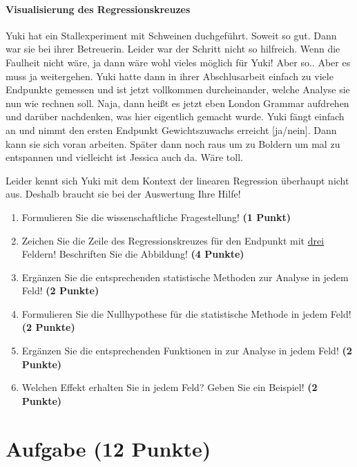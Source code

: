 \documentclass[a4paper, 9pt]{scrartcl}\usepackage[]{graphicx}\usepackage[]{xcolor}
\begin{document}
\ifcollection
\paragraph{Visualisierung des Regressionskreuzes}
\fi

Yuki hat ein Stallexperiment mit Schweinen duchgeführt. Soweit so gut. Dann war sie bei ihrer Betreuerin. Leider war der Schritt nicht so hilfreich.  Wenn die Faulheit nicht wäre, ja dann wäre wohl vieles möglich für Yuki! Aber so.. Aber es muss ja weitergehen. Yuki hatte dann in ihrer Abschlusarbeit einfach zu viele Endpunkte gemessen und ist jetzt vollkommen durcheinander, welche Analyse sie nun wie rechnen soll. Naja, dann heißt es jetzt eben London Grammar aufdrehen und darüber nachdenken, was hier eigentlich gemacht wurde. Yuki fängt einfach an und nimmt den ersten Endpunkt Gewichtszuwachs erreicht [ja/nein]. Dann kann sie sich voran arbeiten. Später dann noch raus um zu Boldern um mal zu entspannen und vielleicht ist Jessica auch da. Wäre toll.

\vspace{1Ex}

Leider kennt sich Yuki mit dem Kontext der linearen Regression überhaupt nicht aus. Deshalb braucht sie bei der Auswertung Ihre Hilfe!

\begin{enumerate}
  \item Formulieren Sie die wissenschaftliche Fragestellung! \textbf{(1 Punkt)}
\item Zeichen Sie die Zeile des Regressionskreuzes für den Endpunkt mit \underline{drei} Feldern! Beschriften Sie die Abbildung! \textbf{(4 Punkte)}
\item Ergänzen Sie die entsprechenden statistische Methoden zur Analyse in jedem Feld! \textbf{(2 Punkte)}
\item Formulieren Sie die Nullhypothese für die statistische Methode in jedem Feld! \textbf{(2 Punkte)}
\item Ergänzen Sie die entsprechenden Funktionen in \Rlogo zur Analyse in jedem Feld! \textbf{(2 Punkte)}
\item Welchen Effekt erhalten Sie in jedem Feld? Geben Sie ein Beispiel! \textbf{(2 Punkte)}
\end{enumerate} 
\clearpage

\section{Aufgabe \hfill (12 Punkte)}
\end{document}
